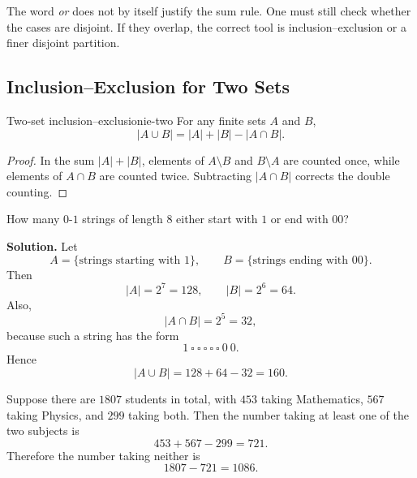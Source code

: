 \begin{commonmistake}[title={Using ``or'' as a signal for addition}]
The word \emph{or} does not by itself justify the sum rule. One must still check whether the cases are disjoint. If they overlap, the correct tool is inclusion--exclusion or a finer disjoint partition.
\end{commonmistake}

\subsection{Inclusion--Exclusion for Two Sets}

\begin{theorem}{Two-set inclusion--exclusion}{ie-two}
For any finite sets $A$ and $B$,
\[
|A\cup B|=|A|+|B|-|A\cap B|.
\]
\end{theorem}

\begin{proof}
In the sum $|A|+|B|$, elements of $A\setminus B$ and $B\setminus A$ are counted once, while elements of $A\cap B$ are counted twice. Subtracting $|A\cap B|$ corrects the double counting.
\end{proof}

\begin{center}
\end{center}

\begin{examplebox}[title={Bit strings of length 8}]
How many $0$-$1$ strings of length $8$ either start with $1$ or end with $00$?

\textbf{Solution.}
Let
\[
A=\{\text{strings starting with }1\},
\qquad
B=\{\text{strings ending with }00\}.
\]
Then
\[
|A|=2^7=128,
\qquad
|B|=2^6=64.
\]
Also,
\[
|A\cap B|=2^5=32,
\]
because such a string has the form
\[
1\ \square\ \square\ \square\ \square\ \square\ 0\ 0.
\]
Hence
\[
|A\cup B|=128+64-32=160.
\]
\end{examplebox}

\begin{examplebox}[title={Students taking Mathematics or Physics}]
Suppose there are $1807$ students in total, with $453$ taking Mathematics, $567$ taking Physics, and $299$ taking both. Then the number taking at least one of the two subjects is
\[
453+567-299=721.
\]
Therefore the number taking neither is
\[
1807-721=1086.
\]
\end{examplebox}

